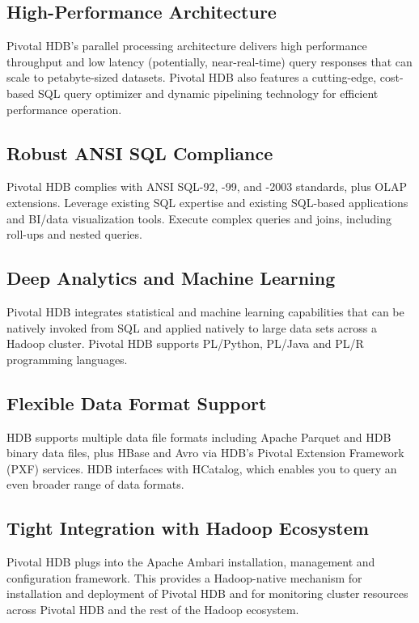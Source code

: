 \documentclass[9pt,twocolumn,twoside]{styles/osajnl}
\begin{document}
\subsection{High-Performance Architecture}

Pivotal HDB’s parallel processing architecture delivers high 
performance throughput and low latency (potentially, near-real-time) 
query responses that can scale to petabyte-sized datasets. Pivotal 
HDB also features a cutting-edge, cost-based SQL query optimizer and 
dynamic pipelining technology for efficient performance operation.

\subsection{Robust ANSI SQL Compliance}

Pivotal HDB complies with ANSI SQL-92, -99, and -2003 standards, plus 
OLAP extensions. Leverage existing SQL expertise and existing 
SQL-based applications and BI/data visualization tools. Execute 
complex queries and joins, including roll-ups and nested queries.

\subsection{Deep Analytics and Machine Learning}

Pivotal HDB integrates statistical and machine learning capabilities 
that can be natively invoked from SQL and applied natively to large 
data sets across a Hadoop cluster. Pivotal HDB supports PL/Python, 
PL/Java and PL/R programming languages.

\subsection{Flexible Data Format Support}

HDB supports multiple data file formats including Apache Parquet and 
HDB binary data files, plus HBase and Avro via HDB’s Pivotal 
Extension Framework (PXF) services. HDB interfaces with HCatalog, 
which enables you to query an even broader range of data formats.

\subsection{Tight Integration with Hadoop Ecosystem}

Pivotal HDB plugs into the Apache Ambari installation, management and 
configuration framework. This provides a Hadoop-native mechanism for 
installation and deployment of Pivotal HDB and for monitoring cluster 
resources across Pivotal HDB and the rest of the Hadoop ecosystem.
\end{document}
